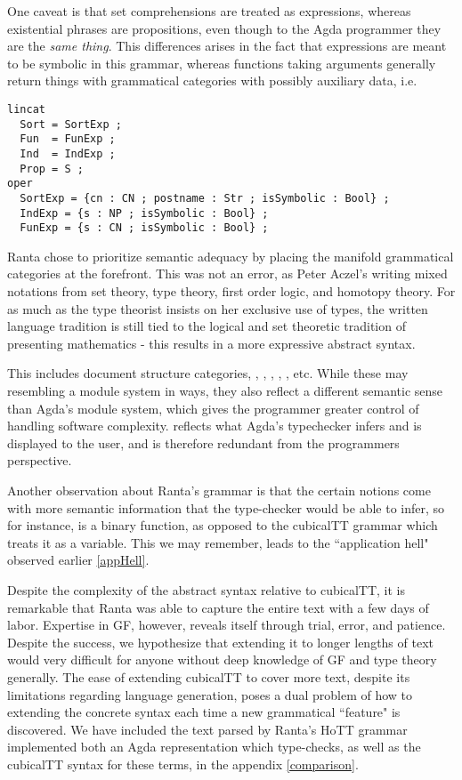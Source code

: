 One caveat is that set comprehensions are treated as expressions, whereas
existential phrases are propositions, even though to the Agda programmer they
are the \emph{same thing}. This differences arises in the fact that expressions
are meant to be symbolic in this grammar, whereas functions taking 
arguments generally return things with grammatical categories with possibly
auxiliary data, i.e.

\begin{verbatim}
lincat
  Sort = SortExp ;
  Fun  = FunExp ;
  Ind  = IndExp ; 
  Prop = S ;
oper
  SortExp = {cn : CN ; postname : Str ; isSymbolic : Bool} ;
  IndExp = {s : NP ; isSymbolic : Bool} ;
  FunExp = {s : CN ; isSymbolic : Bool} ;
\end{verbatim}

Ranta chose to prioritize semantic adequacy by placing the manifold
grammatical categories at the forefront. This was not an error, as Peter Aczel's
writing mixed notations from set theory, type theory, first order logic, and
homotopy theory. For as much as the type theorist insists on her exclusive use
of types, the written language tradition is still tied to the logical and set
theoretic tradition of presenting mathematics - this results in a
more expressive abstract syntax.

This includes document structure categories, , ,
, , , etc. While
these may resembling a module system in ways, they also reflect a different
semantic sense than Agda's module system, which gives the programmer greater
control of handling software complexity.  reflects
what Agda's typechecker infers and is displayed to the user, and is therefore
redundant from the programmers perspective.

Another observation about Ranta's grammar is that the certain notions come with
more semantic information that the type-checker would be able to infer, so for
instance,  is a binary function, as opposed to the cubicalTT
grammar which treats it as a variable. This we may remember, leads to the
``application hell" observed earlier \ref{appHell}.

Despite the complexity of the abstract syntax relative to cubicalTT, it is
remarkable that Ranta was able to capture the entire text with a few days of
labor. Expertise in GF, however, reveals itself through trial, error, and
patience. Despite the success, we hypothesize that extending it to longer
lengths of text would very difficult for anyone without deep knowledge of GF and
type theory generally. The ease of extending cubicalTT to cover more text,
despite its limitations regarding language generation, poses a dual problem of
how to extending the concrete syntax each time a new grammatical ``feature" is
discovered. We have included the text parsed by Ranta's HoTT grammar implemented
both an Agda representation which type-checks, as well as the cubicalTT syntax
for these terms, in the appendix \ref{comparison}.

